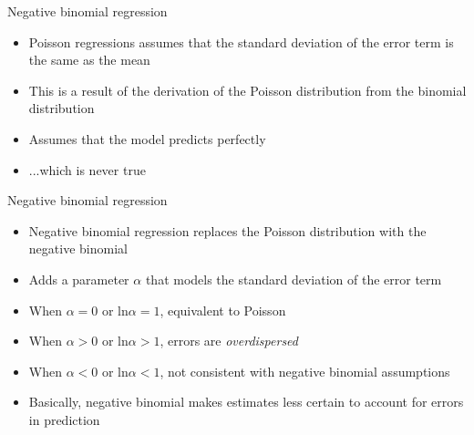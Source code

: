 \begin{frame}{Negative binomial regression}
  \begin{itemize}
    \item Poisson regressions assumes that the standard deviation of the error term is the same as the mean
    \item This is a result of the derivation of the Poisson distribution from the binomial distribution
    \item Assumes that the model predicts perfectly
    \pause\item ...which is never true
  \end{itemize}
\end{frame}

\begin{frame}{Negative binomial regression}
  \begin{itemize}
    \item Negative binomial regression replaces the Poisson distribution with the negative binomial
    \item Adds a parameter $\alpha$ that models the standard deviation of the error term
    \item When $\alpha = 0$ or $\mathrm{ln} \alpha = 1$, equivalent to Poisson
    \item When $\alpha > 0$ or $\mathrm{ln} \alpha > 1$, errors are \emph{overdispersed}
    \item When $\alpha < 0$ or $\mathrm{ln} \alpha < 1$, not consistent with negative binomial assumptions
    \item Basically, negative binomial makes estimates less certain to account for errors in prediction
  \end{itemize}
\end{frame}


